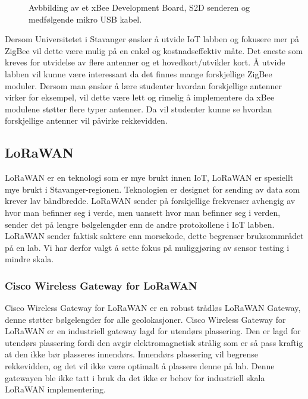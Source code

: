 \documentclass{article}
\begin{document}
\begin{figure}[!ht]
  \centering
  \caption{Avbbilding av et xBee Development Board, S2D senderen og medfølgende mikro USB kabel.}
\end{figure}

Dersom Universitetet i Stavanger ønsker å utvide IoT labben og fokusere mer på ZigBee vil dette være mulig på en enkel og kostnadseffektiv måte. Det eneste som kreves for utvidelse av flere antenner og et hovedkort/utvikler kort. Å utvide labben vil kunne være interessant da det finnes mange forskjellige ZigBee moduler. Dersom man ønsker å lære studenter hvordan forskjellige antenner virker for eksempel, vil dette være lett og rimelig å implementere da xBee modulene støtter flere typer antenner. Da vil studenter kunne se hvordan forskjellige antenner vil påvirke rekkevidden.


\subsection{LoRaWAN}
LoRaWAN er en teknologi som er mye brukt innen IoT, LoRaWAN er spesiellt mye brukt i Stavanger-regionen. Teknologien er designet for sending av data som krever lav båndbredde. LoRaWAN sender på forskjellige frekvenser avhengig av hvor man befinner seg i verde, men uansett hvor man befinner seg i verden, sender det på lengre bølgelengder enn de andre protokollene i IoT labben. LoRaWAN sender faktisk saktere enn morsekode, dette begrenser bruksommrådet på en lab. Vi har derfor valgt å sette fokus på muliggjøring av sensor testing i mindre skala.  


\subsubsection{Cisco Wireless Gateway for LoRaWAN}
Cisco Wireless Gateway\cite{ciscolora} for LoRaWAN er en robust trådløs LoRaWAN Gateway, denne støtter bølgelengder for alle geolokasjoner. Cisco Wireless Gateway for LoRaWAN er en industriell gateway lagd for utendørs plassering. Den er lagd for utendørs plassering fordi den avgir elektromagnetisk strålig som er så pass kraftig at den ikke bør plasseres innendørs. Innendørs plassering vil begrense rekkevidden, og det vil ikke være optimalt å plassere denne på lab. Denne gatewayen ble ikke tatt i bruk da det ikke er behov for industriell skala LoRaWAN implementering. 
\end{document}
